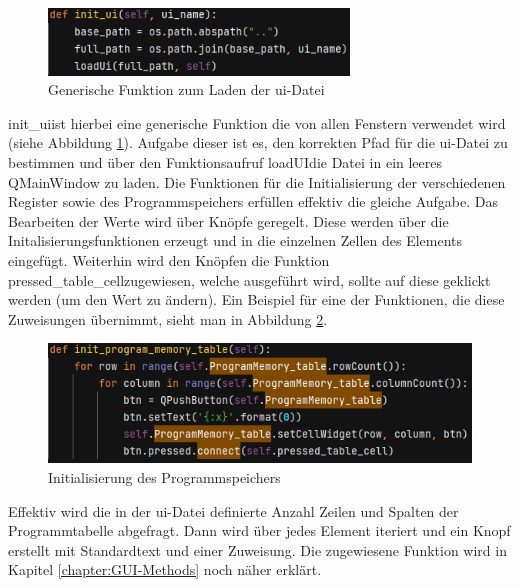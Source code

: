 \documentclass[12pt]{article}
\newcommand{\imgSpaceBefore}{\vspace{10pt}}
\begin{document}
\vspace{15pt}

\begin{figure}[H]
\centering
\includegraphics[width=8cm]{bilder/initUI}
\caption{Generische Funktion zum Laden der \glqq ui\grqq-Datei}
\label{fig:InitUI}
\end{figure}


\noindent
\glqq init\_ui\grqq ist hierbei eine generische Funktion die von allen Fenstern verwendet wird (siehe Abbildung  \ref{fig:InitUI}).
Aufgabe dieser ist es, den korrekten Pfad für die \glqq ui\grqq-Datei zu bestimmen und über den Funktionsaufruf \glqq loadUI\grqq die Datei in ein leeres QMainWindow zu laden. Die Funktionen für die Initialisierung der verschiedenen Register sowie des Programmspeichers erfüllen effektiv die gleiche Aufgabe. Das Bearbeiten der Werte wird über Knöpfe geregelt. Diese werden über die Initalisierungsfunktionen erzeugt und in die einzelnen Zellen des Elements eingefügt. Weiterhin wird den Knöpfen die Funktion \glqq pressed\_table\_cell\grqq zugewiesen, welche ausgeführt wird, sollte auf diese geklickt werden (um den Wert zu ändern). Ein Beispiel für eine der Funktionen, die diese Zuweisungen übernimmt, sieht man in Abbildung \ref{fig:InitProgMem}.\imgSpaceBefore

\begin{figure}[H]
\centering
\includegraphics[width=12cm]{bilder/initProgMem}
\caption{Initialisierung des Programmspeichers}
\label{fig:InitProgMem}
\end{figure}

\noindent
Effektiv wird die in der \glqq ui\grqq-Datei definierte Anzahl Zeilen und Spalten der Programmtabelle abgefragt. Dann wird über jedes Element iteriert und ein Knopf erstellt mit Standardtext und einer Zuweisung. Die zugewiesene Funktion wird in Kapitel \ref{chapter:GUI-Methods} noch näher erklärt.

\newpage
\end{document}

